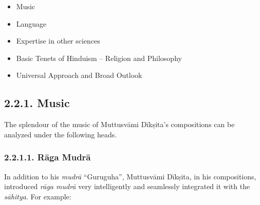 \begin{itemize}
\item Music

 \item Language

 \item Expertise in other sciences

 \item Basic Tenets of Hinduism – Religion and Philosophy

 \item Universal Approach and Broad Outlook

\end{itemize}


\subsection*{2.2.1. Music}

The splendour of the music of Muttusvāmi Dīkṣita’s compositions can be analyzed under the following heads.

\subsubsection*{2.2.1.1. Rāga Mudrā}

In addition to his \textit{mudrā} “Guruguha”, Muttusvāmi Dīkṣita, in his compositions, introduced \textit{rāga mudrā} very intelligently and seamlessly integrated it with the \textit{sāhitya}. For example:

